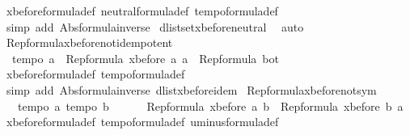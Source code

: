 \begin{isabellebody}
%
\isadelimproof
%
\endisadelimproof
%
\isatagproof
{}\isamarkupfalse%
\ xbefore{\isacharunderscore}formula{\isacharunderscore}def\ neutral{\isacharunderscore}formula{\isacharunderscore}def\ tempo{}{\isacharunderscore}formula{\isacharunderscore}def\isanewline
{}\isamarkupfalse%
\ {\isacharparenleft}simp\ add{\isacharcolon}\ Abs{\isacharunderscore}formula{\isacharunderscore}inverse{\isacharparenright}\isanewline
{}\isamarkupfalse%
\ dlistset{\isacharunderscore}xbefore{\isacharunderscore}neutral{\isacharunderscore}{}\ \isamarkupfalse%
\ auto%
\endisatagproof
{\isafoldproof}%
%
\isadelimproof
\isanewline
%
\endisadelimproof
\isanewline
{}\isamarkupfalse%
\ Rep{\isacharunderscore}formula{\isacharunderscore}xbefore{\isacharunderscore}not{\isacharunderscore}idempotent{\isacharcolon}\ \isanewline
\ \ {\isachardoublequoteopen}tempo{}\ a\ {\isasymLongrightarrow}\ Rep{\isacharunderscore}formula\ {\isacharparenleft}xbefore\ a\ a{\isacharparenright}\ {\isacharequal}\ Rep{\isacharunderscore}formula\ bot{\isachardoublequoteclose}\isanewline
%
\isadelimproof
%
\endisadelimproof
%
\isatagproof
{}\isamarkupfalse%
\ xbefore{\isacharunderscore}formula{\isacharunderscore}def\ tempo{}{\isacharunderscore}formula{\isacharunderscore}def\ \isanewline
{}\isamarkupfalse%
\ {\isacharparenleft}simp\ add{\isacharcolon}\ Abs{\isacharunderscore}formula{\isacharunderscore}inverse\ dlist{\isacharunderscore}xbefore{\isacharunderscore}idem{\isacharparenright}%
\endisatagproof
{\isafoldproof}%
%
\isadelimproof
\isanewline
%
\endisadelimproof
\isanewline
{}\isamarkupfalse%
\ Rep{\isacharunderscore}formula{\isacharunderscore}xbefore{\isacharunderscore}not{\isacharunderscore}sym{\isacharcolon}\isanewline
\ \ {\isachardoublequoteopen}{\isasymlbrakk}\ tempo{}\ a{\isacharsemicolon}\ tempo{}\ b{\isasymrbrakk}\ {\isasymLongrightarrow}\ \isanewline
\ \ \ \ Rep{\isacharunderscore}formula\ {\isacharparenleft}xbefore\ a\ b{\isacharparenright}\ {\isasymsubseteq}\ Rep{\isacharunderscore}formula\ {\isacharparenleft}{\isacharminus}xbefore\ b\ a{\isacharparenright}{\isachardoublequoteclose}\isanewline
%
\isadelimproof
%
\endisadelimproof
%
\isatagproof
{}\isamarkupfalse%
\ xbefore{\isacharunderscore}formula{\isacharunderscore}def\ tempo{}{\isacharunderscore}formula{\isacharunderscore}def\ uminus{\isacharunderscore}formula{\isacharunderscore}def\isanewline
{}\isamarkupfalse%

\end{isabellebody}
